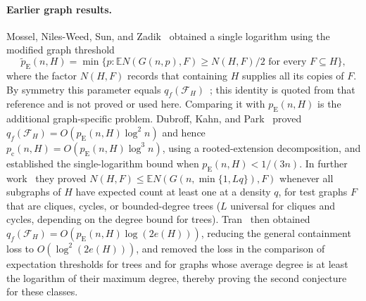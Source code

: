 \documentclass[11pt]{article}
\numberwithin{equation}{section}
\newcommand{\EE}{\mathbb E}
\newcommand{\pc}{p_{\mathrm c}}
\newcommand{\pE}{p_{\mathrm E}}
\begin{document}
\paragraph{Earlier graph results.}
Mossel, Niles-Weed, Sun, and Zadik~\cite[Theorem~1]{MNSZ22} obtained a
single logarithm using the modified graph threshold
\[
 \widetilde p_{\mathrm E}(n,H)
 =\min\{p:\EE N(G(n,p),F)\ge N(H,F)/2
                  \text{ for every }F\subseteq H\},
\]
where the factor $N(H,F)$ records that containing $H$ supplies all its
copies of $F$. By symmetry this parameter equals
$q_f(\mathcal F_H)$~\cite[Equation~(1)]{DKP25}; this identity is quoted
from that reference and is not proved or used here. Comparing it with
$\pE(n,H)$ is the additional graph-specific problem. Dubroff, Kahn, and
Park~\cite[Theorems~1.2--1.5]{DKP25} proved
$q_f(\mathcal F_H)=O(\pE(n,H)\log^2 n)$ and hence
$\pc(n,H)=O(\pE(n,H)\log^3 n)$, using a rooted-extension decomposition,
and established the single-logarithm bound when $\pE(n,H)<1/(3n)$. In
further work~\cite[Theorems~1.4--1.5]{DKP25Cases} they proved
$N(H,F)\le\EE N(G(n,\min\{1,Lq\}),F)$ whenever all subgraphs of $H$ have
expected count at least one at a density $q$, for test graphs $F$ that
are cliques, cycles, or bounded-degree trees ($L$ universal for cliques
and cycles, depending on the degree bound for trees).
Tran~\cite{Tran26} then obtained
$q_f(\mathcal F_H)=O(\pE(n,H)\log(2e(H)))$, reducing the general
containment loss to $O(\log^2(2e(H)))$, and removed the loss in the
comparison of expectation thresholds for trees and for graphs whose
average degree is at least the logarithm of their maximum degree,
thereby proving the second conjecture for these classes.
\end{document}
